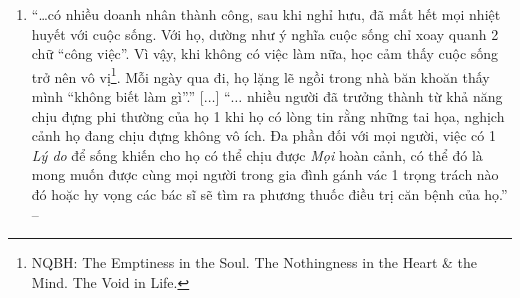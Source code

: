 \documentclass[oneside]{book}
\numberwithin{equation}{section}
\begin{document}
\begin{enumerate}[leftmargin=0mm]
	``Frankl would have argued that we are never left with nothing as long as we retain\footnote{\textbf{retain} [v] \textbf{1.} \textbf{retain somebody\texttt{/}something} to keep somebody\texttt{/}something; to continue to have something \& not lose it or get rid of it; \textbf{2.} \textbf{retain something}to take in a substance \& keep holding it; \textbf{3.} \textbf{retain something} to remember or continue to hold something; \textbf{4.} \textbf{retain somebody\texttt{/}something} (\textit{law}) to employ a professional person such as a lawyer or doctor; to make regular payments to such a person in order to keep their services.} the freedom to choose how we will respond.'' -- \cite[Preface by \textsc{Harold S. Kushner}, p. 10]{Frankl2013}
	\item ``\ldots có nhiều doanh nhân thành công, sau khi nghỉ hưu, đã mất hết mọi nhiệt huyết với cuộc sống. Với họ, dường như ý nghĩa cuộc sống chỉ xoay quanh 2 chữ ``công việc''. Vì vậy, khi không có việc làm nữa, học cảm thấy cuộc sống trở nên vô vị\footnote{NQBH: The Emptiness in the Soul. The Nothingness in the Heart \& the Mind. The Void in Life.}. Mỗi ngày qua đi, họ lặng lẽ ngồi trong nhà băn khoăn thấy mình ``không biết làm gì''.'' [$\ldots$] ``$\ldots$ nhiều người đã trưởng thành từ khả năng chịu đựng phi thường của họ 1 khi họ có lòng tin rằng những tai họa, nghịch cảnh họ đang chịu đựng không vô ích. Đa phần đối với mọi người, việc có 1 \textit{Lý do} để sống khiến cho họ có thể chịu được \textit{Mọi} hoàn cảnh, có thể đó là mong muốn được cùng mọi người trong gia đình gánh vác 1 trọng trách nào đó hoặc hy vọng các bác sĩ sẽ tìm ra phương thuốc điều trị căn bệnh của họ.'' -- \cite[p. 8]{Frankl2022}
	

\end{enumerate}
\end{document}
